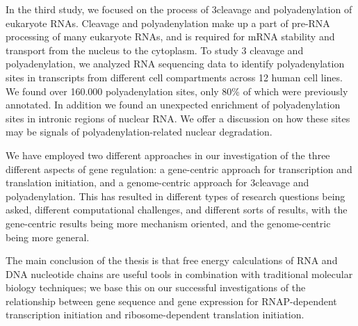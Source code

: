 In the third study, we focused on the process of 3\ppp cleavage and
polyadenylation of eukaryote RNAs. Cleavage and polyadenylation make up a part
of pre-RNA processing of many eukaryote RNAs, and is required for mRNA
stability and transport from the nucleus to the cytoplasm. To study 3\ppp
cleavage and polyadenylation, we analyzed RNA sequencing data to identify
polyadenylation sites in transcripts from different cell compartments across 12
human cell lines. We found over 160.000 polyadenylation sites, only 80\% of
which were previously annotated. In addition we found an unexpected enrichment
of polyadenylation sites in intronic regions of nuclear RNA. We offer a
discussion on how these sites may be signals of polyadenylation-related nuclear
degradation.

We have employed two different approaches in our investigation of the three
different aspects of gene regulation: a gene-centric approach for transcription
and translation initiation, and a genome-centric approach for 3\ppp cleavage
and polyadenylation. This has resulted in different types of research questions
being asked, different computational challenges, and different sorts of
results, with the gene-centric results being more mechanism oriented, and the
genome-centric being more general.

The main conclusion of the thesis is that free energy calculations of RNA and
DNA nucleotide chains are useful tools in combination with traditional
molecular biology techniques; we base this on our successful investigations of
the relationship between gene sequence and gene expression for RNAP-dependent
transcription initiation and ribosome-dependent translation initiation.

